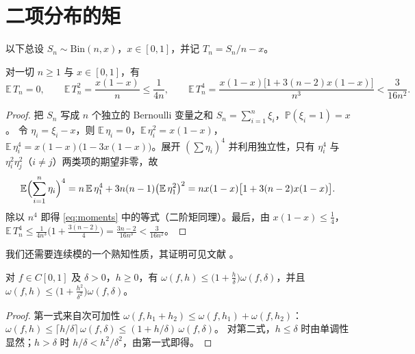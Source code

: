 \documentclass{mojing-paper}
\begin{document}
\section{二项分布的矩}

以下总设 $S_n\sim\mathrm{Bin}(n,x)$，$x\in[0,1]$，并记 $T_n=S_n/n-x$。

\begin{lemma}\label{lem:moments}
对一切 $n\ge1$ 与 $x\in[0,1]$，有
\begin{equation}\label{eq:moments}
  \mathbb{E}\,T_n=0,\qquad
  \mathbb{E}\,T_n^2=\frac{x(1-x)}{n}\le\frac{1}{4n},\qquad
  \mathbb{E}\,T_n^4=\frac{x(1-x)\bigl[1+3(n-2)x(1-x)\bigr]}{n^3}<\frac{3}{16n^2}.
\end{equation}
\end{lemma}

\begin{proof}
把 $S_n$ 写成 $n$ 个独立的 Bernoulli 变量之和 $S_n=\sum_{i=1}^n\xi_i$，$\mathbb{P}(\xi_i=1)=x$。
令 $\eta_i=\xi_i-x$，则 $\mathbb{E}\,\eta_i=0$，$\mathbb{E}\,\eta_i^2=x(1-x)$，
$\mathbb{E}\,\eta_i^4=x(1-x)\bigl(1-3x(1-x)\bigr)$。展开 $(\sum\eta_i)^4$ 并利用独立性，只有
$\eta_i^4$ 与 $\eta_i^2\eta_j^2$（$i\ne j$）两类项的期望非零，故
\[
  \mathbb{E}\Bigl(\sum_{i=1}^n\eta_i\Bigr)^4=n\,\mathbb{E}\,\eta_1^4+3n(n-1)\bigl(\mathbb{E}\,\eta_1^2\bigr)^2
  =nx(1-x)\bigl[1+3(n-2)x(1-x)\bigr].
\]
除以 $n^4$ 即得 \cref{eq:moments} 中的等式（二阶矩同理）。最后，由 $x(1-x)\le\frac14$，
$\mathbb{E}\,T_n^4\le\frac{1}{4n^3}\bigl(1+\frac{3(n-2)}{4}\bigr)=\frac{3n-2}{16n^3}<\frac{3}{16n^2}$。
\end{proof}

我们还需要连续模的一个熟知性质，其证明可见文献 \parencite[第 2 章]{devore1993}。

\begin{lemma}\label{lem:modulus}
对 $f\in C[0,1]$ 及 $\delta>0$，$h\ge0$，有
$\omega(f,h)\le\bigl(1+\frac{h}{\delta}\bigr)\omega(f,\delta)$，并且
$\omega(f,h)\le\bigl(1+\frac{h^2}{\delta^2}\bigr)\omega(f,\delta)$。
\end{lemma}

\begin{proof}
第一式来自次可加性 $\omega(f,h_1+h_2)\le\omega(f,h_1)+\omega(f,h_2)$：
$\omega(f,h)\le\lceil h/\delta\rceil\,\omega(f,\delta)\le(1+h/\delta)\,\omega(f,\delta)$。
对第二式，$h\le\delta$ 时由单调性显然；$h>\delta$ 时 $h/\delta<h^2/\delta^2$，由第一式即得。
\end{proof}
\end{document}
